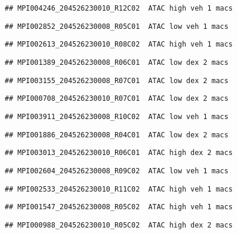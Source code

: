 \documentclass[
]{article}
\begin{document}
\begin{verbatim}
## MPI004246_204526230010_R12C02  ATAC high veh 1 macs
\end{verbatim}

\begin{verbatim}
## MPI002852_204526230008_R05C01  ATAC low veh 1 macs
\end{verbatim}

\begin{verbatim}
## MPI002613_204526230010_R08C02  ATAC high veh 1 macs
\end{verbatim}

\begin{verbatim}
## MPI001389_204526230008_R06C01  ATAC low dex 2 macs
\end{verbatim}

\begin{verbatim}
## MPI003155_204526230008_R07C01  ATAC low dex 2 macs
\end{verbatim}

\begin{verbatim}
## MPI000708_204526230010_R07C01  ATAC low dex 2 macs
\end{verbatim}

\begin{verbatim}
## MPI003911_204526230008_R10C02  ATAC low veh 1 macs
\end{verbatim}

\begin{verbatim}
## MPI001886_204526230008_R04C01  ATAC low dex 2 macs
\end{verbatim}

\begin{verbatim}
## MPI003013_204526230010_R06C01  ATAC high dex 2 macs
\end{verbatim}

\begin{verbatim}
## MPI002604_204526230008_R09C02  ATAC low veh 1 macs
\end{verbatim}

\begin{verbatim}
## MPI002533_204526230010_R11C02  ATAC high veh 1 macs
\end{verbatim}

\begin{verbatim}
## MPI001547_204526230008_R05C02  ATAC high veh 1 macs
\end{verbatim}

\begin{verbatim}
## MPI000988_204526230010_R05C02  ATAC high dex 2 macs
\end{verbatim}
\end{document}
